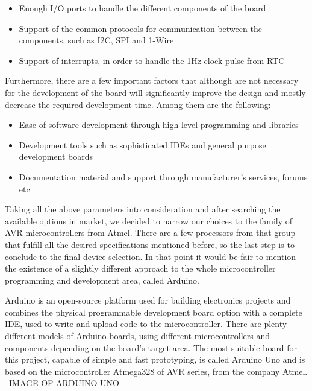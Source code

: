 \begin{itemize}
    \item Enough I/O ports to handle the different components of the board
    \item Support of the common protocols for communication between the components, such as I2C, SPI and 1-Wire
    \item Support of interrupts, in order to handle the 1Hz clock pulse from RTC
\end{itemize}

Furthermore, there are a few important factors that although are not necessary for the development of the board will significantly improve the design and mostly decrease the required development time. Among them are the following:

\begin{itemize}
    \item Ease of software development through high level programming and libraries
    \item Development tools such as sophisticated IDEs and general purpose development boards
    \item Documentation material and support through manufacturer's services, forums etc
\end{itemize}

Taking all the above parameters into consideration and after searching the available options in market, we decided to narrow our choices to the family of AVR microcontrollers from Atmel. There are a few processors from that group that fulfill all the desired specifications mentioned before, so the last step is to conclude to the final device selection. In that point it would be fair to mention the existence of a slightly different approach to the whole microcontroller programming and development area, called Arduino.

Arduino is an open-source platform used for building electronics projects and combines the physical programmable development board option with a complete IDE, used to write and upload code to the microcontroller. There are plenty different models of Arduino boards, using different microcontrollers and components depending on the board's target area. The most suitable board for this project, capable of simple and fast prototyping, is called Arduino Uno and is based on the microcontroller Atmega328 of AVR series, from the company Atmel.\\

--IMAGE OF ARDUINO UNO\\

